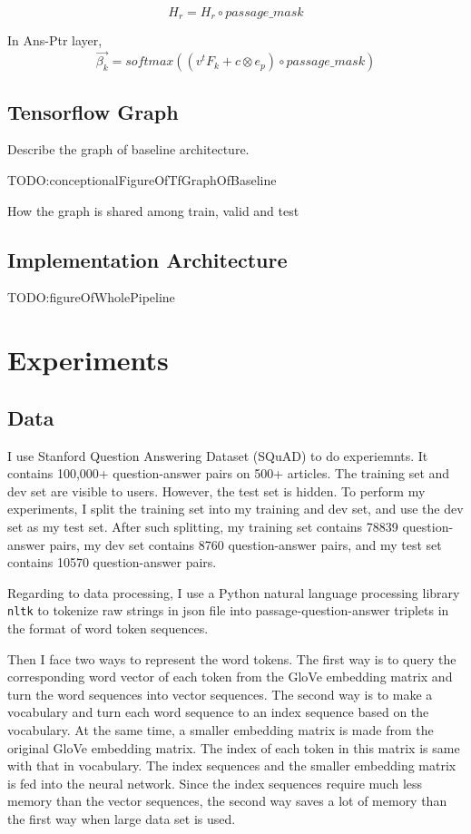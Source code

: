 \documentclass[modernstyle,12pt]{sjsuthesis}
\theoremstyle{definition}
\begin{document}
$$H_r = H_r \circ passage\_mask$$

In Ans-Ptr layer,
$$\overrightarrow{\beta _k} = softmax( (v^tF_k + c \otimes e_p) \circ passage\_mask)$$


\section{Tensorflow Graph}
Describe the graph of baseline architecture.

TODO:conceptionalFigureOfTfGraphOfBaseline

How the graph is shared among train, valid and test


\section{Implementation Architecture}

TODO:figureOfWholePipeline

\chapter{Experiments}
\section{Data}
I use Stanford Question Answering Dataset (SQuAD) to do experiemnts.  It contains 100,000+ question-answer pairs on 500+ articles. The training set and dev set are visible to users. However, the test set is hidden. To perform my experiments, I split the training set into my training and dev set, and use the dev set as my test set. After such splitting, my training set contains 78839 question-answer pairs, my dev set contains 8760 question-answer pairs, and my test set contains 10570 question-answer pairs.

 Regarding to data processing, I use a Python natural language processing library {\tt nltk} to tokenize raw strings in json file into passage-question-answer triplets in the format of word token sequences.

Then I face two ways to represent the word tokens. The first way is to query the corresponding word vector of each token from the GloVe embedding matrix and turn the word sequences into vector sequences.  The second way is to make a vocabulary and turn each word sequence to an index sequence based on the vocabulary. At the same time, a smaller embedding matrix is made from the original GloVe embedding matrix. The index of each token in this matrix is same with that in vocabulary. The index sequences and the smaller embedding matrix is fed into the neural network. Since the index sequences require much less memory than the vector sequences, the second way saves a lot of memory than the first way when large data set is used.
\end{document}
